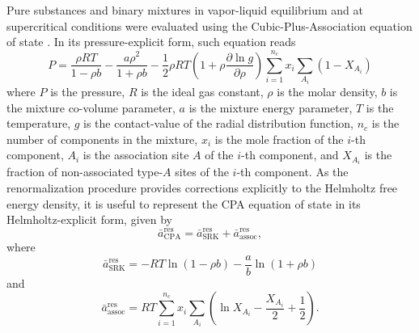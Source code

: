 \documentclass[preprint,12pt,3p]{elsarticle}
\begin{document}
Pure substances and binary mixtures in vapor-liquid equilibrium and at supercritical conditions were evaluated using the Cubic-Plus-Association equation of state \citep{kontogeorgis1996equation}.
In its pressure-explicit form, such equation reads
\begin{equation} \label{eq:pressure_cpa}
P = \frac{\rho RT}{1-\rho b}-\frac{a \rho^2}{1+\rho b}-\frac{1}{2} \rho RT \left(1+\rho\frac{\partial \ln g}{\partial \rho}\right)\sum_{i=1}^{n_c} x_{i} \sum_{A_{i}}(1-X_{A_{i}})
\end{equation}
where $P$ is the pressure,
$R$ is the ideal gas constant,
$\rho$ is the molar density,
$b$ is the mixture co-volume parameter,
$a$ is the mixture energy parameter,
$T$ is the temperature,
$g$ is the contact-value of the radial distribution function,
$n_c$ is the number of components in the mixture,
$x_{i}$ is the mole fraction of the $i$-th component,
$A_{i}$ is the association site $A$ of the $i$-th component, and
$X_{A_{i}}$ is the fraction of non-associated type-$A$ sites of the $i$-th component.
As the renormalization procedure provides corrections explicitly to the Helmholtz free energy density, it is useful to represent the CPA equation of state in its Helmholtz-explicit form, given by
\begin{equation} \label{eq:helm_res_cpa}
\bar{a}_\text{CPA}^\text{res} =\bar{a}_\text{SRK}^\text{res} + \bar{a}_\text{assoc}^\text{res},
\end{equation}
where
\begin{equation} \label{eq:helm_res_srk}
\bar{a}_\text{SRK}^\text{res} = -RT\ln(1-\rho b)-\frac{a}{b}\ln(1+\rho b)   
\end{equation}
and
\begin{equation} \label{eq:helm_res_assoc}
\bar{a}_\text{assoc}^\text{res} = RT\sum_{i=1}^{n_c} x_{i} \sum_{A_{i}}\left(\ln X_{A_{i}} - \frac{X_{A_{i}}}{2} + \frac{1}{2}\right).
\end{equation}
\end{document}
